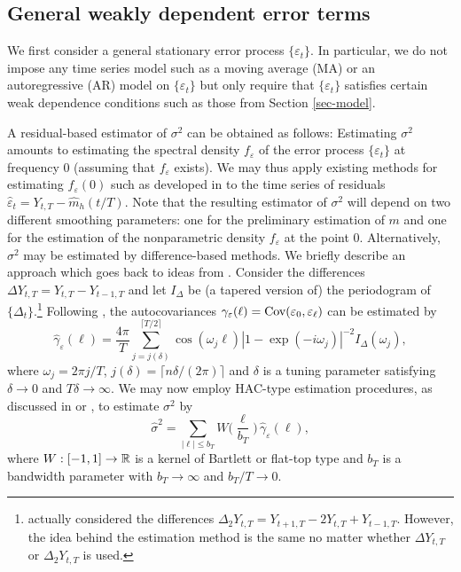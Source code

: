 \subsection{General weakly dependent error terms}


We first consider a general stationary error process $\{ \varepsilon_t \}$. In particular, we do not impose any time series model such as a moving average (MA) or an autoregressive (AR) model on $\{\varepsilon_t\}$ but only require that $\{\varepsilon_t\}$ satisfies certain weak dependence conditions such as those from Section \ref{sec-model}. 


A residual-based estimator of $\sigma^2$ can be obtained as follows: Estimating $\sigma^2$ amounts to estimating the spectral density $f_\varepsilon$ of the error process $\{\varepsilon_t\}$ at frequency $0$ (assuming that $f_\varepsilon$ exists). We may thus apply existing methods for estimating $f_\varepsilon(0)$ such as developed in \cite{LiuWu2010} to the time series of residuals $\widehat{\varepsilon}_t = Y_{t,T} - \widehat{m}_h(t/T)$. Note that the resulting estimator of $\sigma^2$ will depend on two different smoothing parameters: one for the preliminary estimation of $m$ and one for the estimation of the nonparametric density $f_\varepsilon$ at the point $0$. 
Alternatively, $\sigma^2$ may be estimated by difference-based methods. We briefly describe an approach which goes back to ideas from \cite{Hart1989, Hart1991}. Consider the differences $\Delta Y_{t,T} = Y_{t,T} - Y_{t-1,T}$ and let $I_\Delta$ be (a tapered version of) the periodogram of $\{\Delta_t\}$.\footnote{\cite{Hart1989, Hart1991} actually considered the differences $\Delta_2 Y_{t,T} = Y_{t+1,T} - 2Y_{t,T} + Y_{t-1,T}$. However, the idea behind the estimation method is the same no matter whether $\Delta Y_{t,T}$ or $\Delta_2 Y_{t,T}$ is used.} Following \cite{Hart1989, Hart1991}, the autocovariances $\gamma_\varepsilon(\ell) = \textnormal{Cov}(\varepsilon_0,\varepsilon_\ell)$ can be estimated by 
\[ \widehat{\gamma}_\varepsilon(\ell) = \frac{4\pi}{T} \sum\limits_{j = j(\delta)}^{\lceil T/2 \rceil} \cos (\omega_j \ell) |1 - \exp(-i \omega_j)|^{-2} I_\Delta(\omega_j), \]
where $\omega_j = 2\pi j/T$, $j(\delta) = \lceil n\delta/(2\pi) \rceil$ and $\delta$ is a tuning parameter satisfying $\delta \rightarrow 0$ and $T \delta \rightarrow \infty$. We may now employ HAC-type estimation procedures, as discussed in \cite{Andrews1991} or \cite{DeJong2000}, to estimate $\sigma^2$ by 
\[ \widehat{\sigma}^2 = \sum_{|\ell| \le b_T} W \Big( \frac{\ell}{b_T} \Big) \, \widehat{\gamma}_\varepsilon(\ell), \]
where $W: [-1,1] \rightarrow \mathbb{R}$ is a kernel of Bartlett or flat-top type and $b_T$ is a bandwidth parameter with $b_T \rightarrow \infty$ and $b_T/T \rightarrow 0$. 


